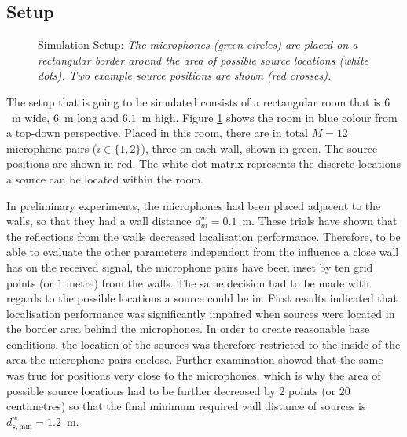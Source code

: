 \subsection{Setup}
\label{sec:setup}

\begin{figure}[!htb]
\iftoggle{quick}{%
	\texttt{[image: plots/setup/setup-screenshot.png]}
}{%
	
}
	\caption[Simulation Setup]{Simulation Setup: \itshape The microphones (green circles) are placed on a rectangular border around the area of possible source locations (white dots). Two example source positions are shown (red crosses).}
	\label{fig:setup}
\end{figure}


The setup that is going to be simulated consists of a rectangular room that is $6$~m wide, $6$~m long and $6.1$~m high. Figure \ref{fig:setup} shows the room in blue colour from a top-down perspective. Placed in this room, there are in total $M=12$ microphone pairs ($i\in\{1,2\}$), three on each wall, shown in green. The source positions are shown in red. The white dot matrix represents the discrete locations a source can be located within the room.

In preliminary experiments, the microphones had been placed adjacent to the walls, so that they had a wall distance $d^w_{m}=0.1$~m. These trials have shown that the reflections from the walls decreased localisation performance. Therefore, to be able to evaluate the other parameters independent from the influence a close wall has on the received signal, the microphone pairs have been inset by ten grid points (or $1$ metre) from the walls. The same decision had to be made with regards to the possible locations a source could be in. First results indicated that localisation performance was significantly impaired when sources were located in the border area behind the microphones. In order to create reasonable base conditions, the location of the sources was therefore restricted to the inside of the area the microphone pairs enclose. Further examination showed that the same was true for positions very close to the microphones, which is why the area of possible source locations had to be further decreased by 2 points (or 20 centimetres) so that the final minimum required wall distance of sources is $d^w_{s,\text{min}}=1.2$~m.